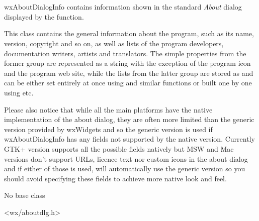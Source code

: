 
\section{}\label{wxaboutdialoginfo}

wxAboutDialogInfo contains information shown in the standard \textit{About}
dialog displayed by the  function.

This class contains the general information about the program, such as its
name, version, copyright and so on, as well as lists of the program developers,
documentation writers, artists and translators. The simple properties from the
former group are represented as a string with the exception of the program icon
and the program web site, while the lists from the latter group are stored as 
 and can be either set entirely at once
using  and similar
functions or built one by one using  
etc.

Please also notice that while all the main platforms have the native
implementation of the about dialog, they are often more limited than the
generic version provided by wxWidgets and so the generic version is used if
wxAboutDialogInfo has any fields not supported by the native version. Currently
GTK+ version supports all the possible fields natively but MSW and Mac versions
don't support URLs, licence text nor custom icons in the about dialog and if
either of those is used,  will automatically
use the generic version so you should avoid specifying these fields to achieve
more native look and feel.


No base class


<wx/aboutdlg.h>




\label{wxaboutdialoginfowxaboutdialoginfo}

